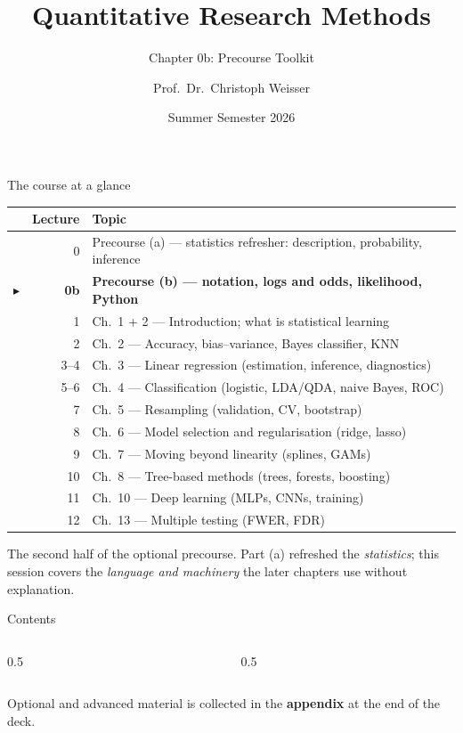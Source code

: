 \documentclass[aspectratio=169,11pt]{beamer}
\title{Quantitative Research Methods}
\subtitle{Chapter 0b: Precourse Toolkit}
\author{Prof.\ Dr.\ Christoph Weisser}\institute{HSBI}
\date{Summer Semester 2026}\graphicspath{{images/}}
\begin{document}
\begin{frame}[plain]\titlepage\end{frame}

\begin{frame}{The course at a glance}
  \footnotesize
  \begin{center}
  \begin{tabular}{@{}c r l@{}}
    & \textbf{Lecture} & \textbf{Topic}\\
    \midrule
     & 0 & Precourse (a) --- statistics refresher: description, probability, inference \\
    $\blacktriangleright$ & \textbf{0b} & \textbf{Precourse (b) --- notation, logs and odds, likelihood, Python} \\
     & 1 & Ch.\ 1 + 2 --- Introduction; what is statistical learning \\
     & 2 & Ch.\ 2 --- Accuracy, bias--variance, Bayes classifier, KNN \\
     & 3--4 & Ch.\ 3 --- Linear regression (estimation, inference, diagnostics) \\
     & 5--6 & Ch.\ 4 --- Classification (logistic, LDA/QDA, naive Bayes, ROC) \\
     & 7 & Ch.\ 5 --- Resampling (validation, CV, bootstrap) \\
     & 8 & Ch.\ 6 --- Model selection and regularisation (ridge, lasso) \\
     & 9 & Ch.\ 7 --- Moving beyond linearity (splines, GAMs) \\
     & 10 & Ch.\ 8 --- Tree-based methods (trees, forests, boosting) \\
     & 11 & Ch.\ 10 --- Deep learning (MLPs, CNNs, training) \\
     & 12 & Ch.\ 13 --- Multiple testing (FWER, FDR) \\
  \end{tabular}
  \end{center}
  \vspace{2pt}
  {\scriptsize The second half of the optional precourse. Part (a) refreshed the
  \emph{statistics}; this session covers the \emph{language and machinery} the
  later chapters use without explanation.}
\end{frame}

\begin{frame}{Contents}
  \begin{columns}[t]
    \begin{column}{0.5\textwidth}
      \tableofcontents[hideallsubsections,sections={1-4}]
    \end{column}
    \begin{column}{0.5\textwidth}
      \tableofcontents[hideallsubsections,sections={5-7}]
    \end{column}
  \end{columns}
  \vfill
  {\tiny Optional and advanced material is collected in the \textbf{appendix} at the end of the deck.}
\end{frame}
\end{document}
